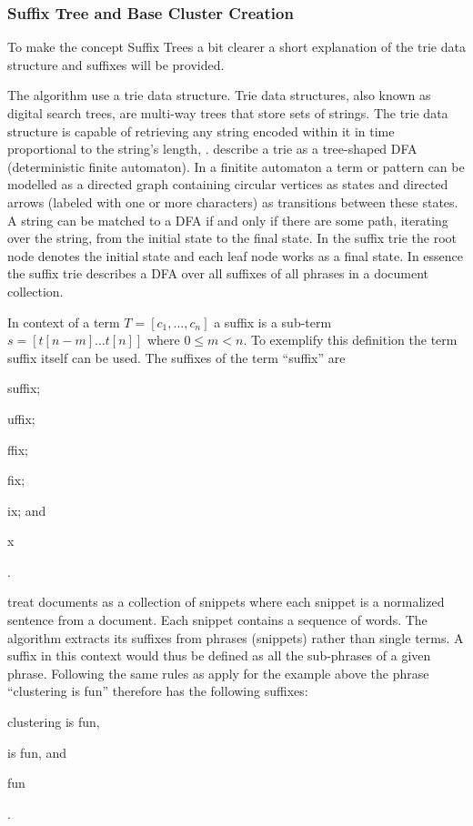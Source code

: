 \subsubsection{Suffix Tree and Base Cluster Creation}

To make the concept Suffix Trees a bit clearer a short explanation of the trie data structure and suffixes will be provided.

The \STC algorithm use a trie data structure. Trie data structures, also known as digital search trees, are multi-way trees that store sets of strings. The trie data structure is capable of retrieving any string encoded within it in time proportional to the string's length, \cite{Baeza-Yates2011c}. \textcite{Baeza-Yates2011c} describe a trie as a tree-shaped DFA (deterministic finite automaton). In a finitite automaton a term or pattern can be modelled as a directed graph containing circular vertices as states and directed arrows (labeled with one or more characters) as transitions between these states. A string can be matched to a DFA if and only if there are some path, iterating over the string, from the initial state to the final state. In the suffix trie the root node denotes the initial state and each leaf node works as a final state. In essence the suffix trie describes a DFA over all suffixes of all phrases in a document collection.

In context of a term \(T = [c_{1}, ..., c_{n}]\) a suffix is a sub-term \(s = [t[n-m] \dots t[n]]\) where \(0 \le m < n\). To exemplify this definition the term suffix itself can be used. The suffixes of the term ``suffix'' are
\begin{inparaenum}[\itshape 1\upshape)]
\item suffix;
\item uffix;
\item ffix;
\item fix;
\item ix; and
\item x
\end{inparaenum}.

\cite{Oren1998} treat documents as a collection of snippets where each snippet is a normalized sentence from a document. Each snippet contains a sequence of words. The \STC algorithm extracts its suffixes from phrases (snippets) rather than single terms. A suffix in this context would thus be defined as all the sub-phrases of a given phrase. Following the same rules as apply for the example above the phrase ``clustering is fun'' therefore has the following suffixes:
\begin{inparaenum}[\itshape 1\upshape)]
\item clustering is fun,
\item is fun, and
\item fun
\end{inparaenum}.

